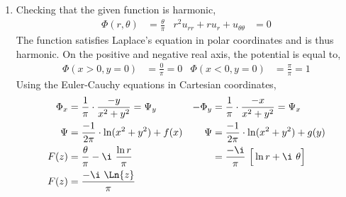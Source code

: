 \begin{enumerate}
    \item Checking that the given function is harmonic,
          \begin{align}
              \Phi(r, \theta)                       & = \frac{\theta}{\pi} &
              r^2 u_{rr} + r u_r + u_{\theta\theta} & = 0
          \end{align}
          The function satisfies Laplace's equation in polar coordinates and is thus
          harmonic. On the positive and negative real axis, the potential is equal to,
          \begin{align}
              \Phi(x>0, y=0) & = \frac{0}{\pi} = 0   &
              \Phi(x<0, y=0) & = \frac{\pi}{\pi} = 1
          \end{align}
          Using the Euler-Cauchy equations in Cartesian coordinates,
          \begin{align}
              \Phi_x  & = \frac{1}{\pi} \cdot \frac{-y}{x^2 + y^2} = \Psi_y &
              -\Phi_y & = \frac{1}{\pi} \cdot \frac{-x}{x^2 + y^2} = \Psi_x   \\
              \Psi    & = \frac{-1}{2\pi} \cdot \ln(x^2 + y^2) + f(x)       &
              \Psi    & = \frac{-1}{2\pi} \cdot \ln(x^2 + y^2) + g(y)         \\
              F(z)    & = \frac{\theta}{\pi} - \i\ \frac{\ln r}{\pi}        &
                      & = \frac{-\i}{\pi}\ \Big[ \ln r + \i\ \theta \Big]     \\
              F(z)    & = \frac{-\i\ \Ln{z}}{\pi}
          \end{align}


\end{enumerate}
